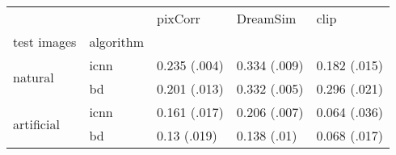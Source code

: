 \begin{tabular}{lllll}
\toprule
 &   & pixCorr & DreamSim & clip \\
test images & algorithm &  &  &  \\
\midrule
\multirow[t]{2}{*}{natural} & icnn & 0.235 (.004) & 0.334 (.009) & 0.182 (.015) \\
 & bd & 0.201 (.013) & 0.332 (.005) & 0.296 (.021) \\
\cline{1-5}
\multirow[t]{2}{*}{artificial} & icnn & 0.161 (.017) & 0.206 (.007) & 0.064 (.036) \\
 & bd & 0.13 (.019) & 0.138 (.01) & 0.068 (.017) \\
\cline{1-5}
\bottomrule
\end{tabular}
